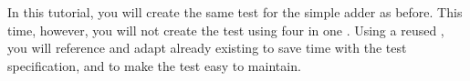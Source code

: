 In this tutorial, you will create the same test for the simple adder \gdaut{} as before. This time, however, you will not create the test using four \gdsteps{} in one \gdcase{}. Using a reused \gdproject{}, you will reference and adapt already existing \gdcases{} to save time with the test specification, and to make the test easy to maintain. 
